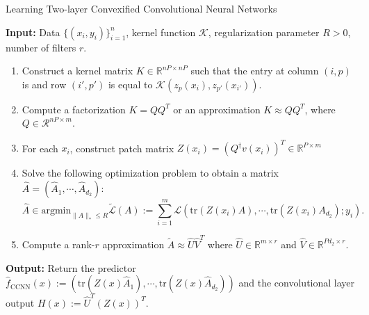 \documentclass{article}
\renewcommand{\algorithmicrequire}{\textbf{Input:}}
\renewcommand{\algorithmicensure}{\textbf{Output:}}
\begin{document}
\begin{algorithm}
\caption{Learning Two-layer Convexified Convolutional Neural Networks}\label{euclid}
\algorithmicrequire{ Data $\lbrace(x_i,y_i)\rbrace_{i=1}^n$, kernel function $\mathcal{K	}$, regularization parameter $R>0$, number of filters $r$.}
\begin{enumerate}
\item Construct a kernel matrix $K\in\mathbb{R}^{nP\times nP}$ such that the entry at column $(i,p)$ is and row $(i',p')$ is equal to $\mathcal{K}(z_p(x_i),z_{p'}(x_{i'}))$.
\item Compute a factorization $K=QQ^T$ or an approximation  $K\approx QQ^T$, where $Q\in\mathcal{R}^{nP\times m}$.
\item For each $x_i$, construct patch matrix $Z(x_i)=(Q^\dagger v(x_i))^T\in\mathbb{R}^{P\times m}$
\item Solve the following optimization problem to obtain a matrix $\widehat{A}=(\widehat{A}_1,\cdots,\widehat{A}_{d_2})$:
\[\widehat{A}\in\text{argmin}_{\|A\|_*\leq R}\tilde{\mathcal{L}}(A):=\sum_{i=1}^m\mathcal{L}(\text{tr}(Z(x_i)A),\cdots,\text{tr}(Z(x_i)A_{d_2});y_i).\]
\item Compute a rank-$r$ approximation $\tilde{A}\approx\widehat{U}\widehat{V}^T$ where $\widehat{U}\in\mathbb{R}^{m\times r}$ and $\widehat{V}\in\mathbb{R}^{Pd_2\times r}$.
\end{enumerate}
\algorithmicensure{ Return the predictor $\widehat{f}_{\text{CCNN}}(x):=(\text{tr}(Z(x)\widehat{A}_1),\cdots,\text{tr}(Z(x)\widehat{A}_{d_2}))$ and the convolutional layer output $H(x):=\widehat{U}^T(Z(x))^T$.}
\end{algorithm}



\end{document}
